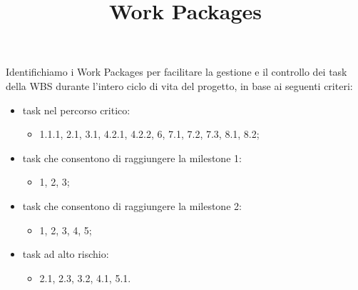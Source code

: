 \documentclass[a4paper,12pt]{article}
\title{\textbf{Work Packages}}
\author{}
\date{}
\begin{document}
\maketitle

Identifichiamo i Work Packages per facilitare la gestione e il controllo dei task della WBS durante l'intero ciclo di
vita del progetto, in base ai seguenti criteri:
\begin{itemize}
    \item task nel percorso critico:
    \begin{itemize}
        \item 1.1.1, 2.1, 3.1, 4.2.1, 4.2.2, 6, 7.1, 7.2, 7.3, 8.1, 8.2;
    \end{itemize}
    \item task che consentono di raggiungere la milestone 1:
    \begin{itemize}
        \item 1, 2, 3;
    \end{itemize}
    \item task che consentono di raggiungere la milestone 2:
    \begin{itemize}
        \item 1, 2, 3, 4, 5;
    \end{itemize}
    \item task ad alto rischio:
    \begin{itemize}
        \item 2.1, 2.3, 3.2, 4.1, 5.1.
    \end{itemize}
\end{itemize}
\end{document}
